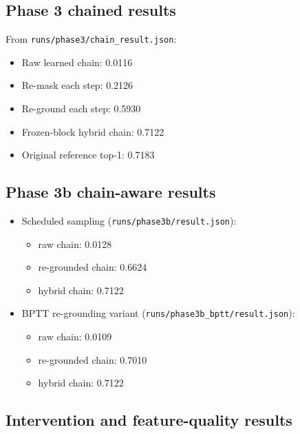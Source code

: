 \documentclass[11pt]{article}
\begin{document}
\subsection{Phase 3 chained results}
From \texttt{runs/phase3/chain\_result.json}:
\begin{itemize}[leftmargin=*]
    \item Raw learned chain: 0.0116
    \item Re-mask each step: 0.2126
    \item Re-ground each step: 0.5930
    \item Frozen-block hybrid chain: 0.7122
    \item Original reference top-1: 0.7183
\end{itemize}

\subsection{Phase 3b chain-aware results}
\begin{itemize}[leftmargin=*]
    \item Scheduled sampling (\texttt{runs/phase3b/result.json}):
    \begin{itemize}[leftmargin=*]
        \item raw chain: 0.0128
        \item re-grounded chain: 0.6624
        \item hybrid chain: 0.7122
    \end{itemize}
    \item BPTT re-grounding variant (\texttt{runs/phase3b\_bptt/result.json}):
    \begin{itemize}[leftmargin=*]
        \item raw chain: 0.0109
        \item re-grounded chain: 0.7010
        \item hybrid chain: 0.7122
    \end{itemize}
\end{itemize}

\subsection{Intervention and feature-quality results}
\end{document}
